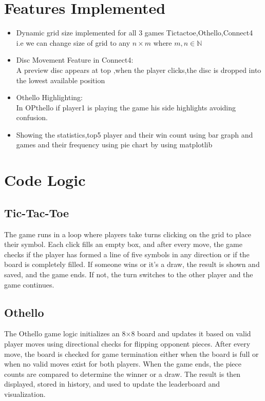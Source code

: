 \documentclass{article}
\begin{document}
\section{Features Implemented}
\begin{itemize}
\item{Dynamic grid size implemented for all 3 games Tictactoe,Othello,Connect4\\  i.e we can change size of grid to any $n \times m$ where $m,n \in \mathbb{N}$}
\item{Disc Movement Feature in Connect4:\\A preview disc appears at top ,when the player clicks,the disc is dropped into the lowest available position}
\item{Othello Highlighting:\\ In OPthello if player1 is playing the game his side highlights avoiding confusion.}
\item{Showing the statistics,top5 player and their win count using bar graph and games and their frequency using pie chart by using matplotlib\cite{iitb_matlplotlib}}
\end{itemize}
\section{Code Logic}
\subsection{Tic-Tac-Toe}
The game runs in a loop where players take turns clicking on the grid to place their symbol. Each click fills an empty box, and after every move, the game checks if the player has formed a line of five symbols in any direction or if the board is completely filled. If someone wins or it’s a draw, the result is shown and saved, and the game ends. If not, the turn switches to the other player and the game continues.
\subsection{Othello}
The Othello game logic initializes an 8×8 board and updates it based on valid player moves using directional checks for flipping opponent pieces. After every move, the board is checked for game termination either when the board is full or when no valid moves exist for both players. When the game ends, the piece counts are compared to determine the winner or a draw. The result is then displayed, stored in history, and used to update the leaderboard and visualization.
\end{document}
